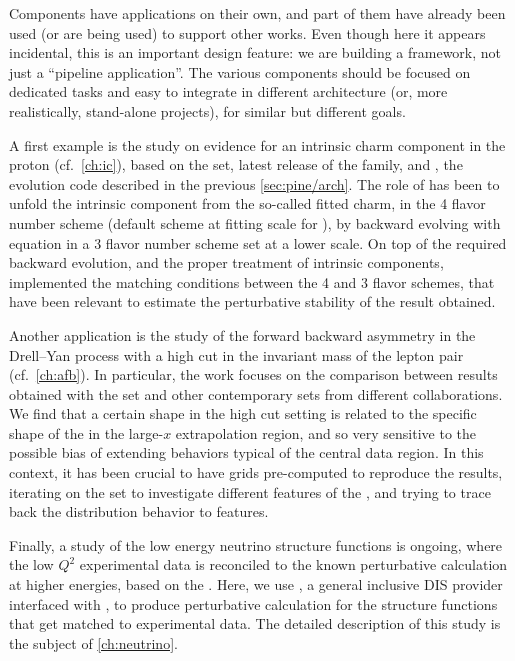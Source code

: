 
Components have applications on their own, and part of them have already been
used (or are being used) to support other works.
Even though here it appears incidental, this is an important design feature: we
are building a framework, not just a \enquote{pipeline application}.
The various components should be focused on dedicated tasks and easy to
integrate in different architecture (or, more realistically, stand-alone
projects), for similar but different goals.

A first example is the study on evidence
for an intrinsic charm component in the proton \cite{Ball:2022qks} (cf.\
\cref{ch:ic}), based on the  \pdf set, latest release of the \nnpdf
family, and \eko \cite{Candido:2022tld}, the evolution code described in the
previous \cref{sec:pine/arch}.
The role of \eko has been to unfold the intrinsic component from the so-called
fitted charm, in the 4 flavor number scheme (default scheme at fitting scale
for \nnpdf), by backward evolving with \dglap equation in a 3 flavor number
scheme \pdf set at a lower scale.
On top of the required backward evolution, and the proper treatment of
intrinsic components,
\eko implemented the \nnnlo matching conditions
between the 4 and 3 flavor schemes, that have been relevant to estimate the
perturbative stability of the result obtained.

Another application is the study of the forward backward asymmetry in the
Drell--Yan process with a high cut in the invariant mass of the
lepton pair \cite{Ball:2022qtp} (cf.\ \cref{ch:afb}).
In particular, the work focuses on the comparison between results obtained with
the \nnpdf 4.0 \pdf set and other contemporary ets from different
collaborations. We find that a certain shape in the high cut setting is related
to the specific shape of the \pdfs in the large-$x$ extrapolation region, and
so very sensitive to the possible bias of extending behaviors typical of the
central data region.
In this context, it has been crucial to have \pineappl \cite{Carrazza:2020gss}
\cite{christopher_schwan_2022_7145377} grids pre-computed to reproduce the
results, iterating on the \pdf set to investigate different features of the
\pdf, and trying to trace back the distribution behavior to \pdf features.

Finally, a study of the low energy neutrino structure functions is ongoing,
where the low $Q^2$ experimental data is reconciled to the known
perturbative calculation at higher energies, based on the \pdfs.
Here, we use \yadism, a general inclusive DIS provider
interfaced with \pineappl, to produce perturbative \qcd calculation for the
structure functions that get matched to experimental data.
The detailed description of this study is the subject of \cref{ch:neutrino}.
